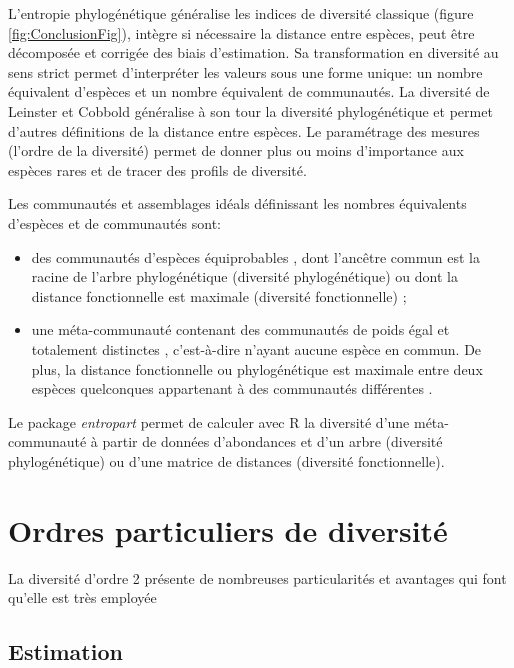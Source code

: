 \documentclass[
  11pt,
  french,
  a4paper,
  extrafontsizes,onecolumn,openright
  ]{memoir}
\providecommand{\tightlist}{%
  \setlength{\itemsep}{0pt}\setlength{\parskip}{0pt}}
\begin{document}
L'entropie phylogénétique généralise les indices de diversité classique (figure \ref{fig:ConclusionFig}), intègre si nécessaire la distance entre espèces, peut être décomposée et corrigée des biais d'estimation.
Sa transformation en diversité au sens strict permet d'interpréter les valeurs sous une forme unique: un nombre équivalent d'espèces et un nombre équivalent de communautés.
La diversité de Leinster et Cobbold généralise à son tour la diversité phylogénétique et permet d'autres définitions de la distance entre espèces.
Le paramétrage des mesures (l'ordre de la diversité) permet de donner plus ou moins d'importance aux espèces rares et de tracer des profils de diversité.

Les communautés et assemblages idéals définissant les nombres équivalents d'espèces et de communautés sont:

\begin{itemize}
\tightlist
\item
  des communautés d'espèces équiprobables \autocite{Hill1973}, dont l'ancêtre commun est la racine de l'arbre phylogénétique (diversité phylogénétique)\autocite{Marcon2014b} ou dont la distance fonctionnelle est maximale (diversité fonctionnelle) \autocite{Leinster2012};
\item
  une méta-communauté contenant des communautés de poids égal et totalement distinctes \autocite{Jost2007}, c'est-à-dire n'ayant aucune espèce en commun. De plus, la distance fonctionnelle ou phylogénétique est maximale entre deux espèces quelconques appartenant à des communautés différentes \autocite{Pavoine2015a}.
\end{itemize}

Le package \emph{entropart}\autocite{Marcon2014c} permet de calculer avec R la diversité d'une méta-communauté à partir de données d'abondances et d'un arbre (diversité phylogénétique) ou d'une matrice de distances (diversité fonctionnelle).

\hypertarget{ordres-particuliers-de-diversituxe9}{%
\section{Ordres particuliers de diversité}\label{ordres-particuliers-de-diversituxe9}}

La diversité d'ordre 2 présente de nombreuses particularités et avantages qui font qu'elle est très employée

\hypertarget{estimation-2}{%
\subsection{Estimation}\label{estimation-2}}
\end{document}
